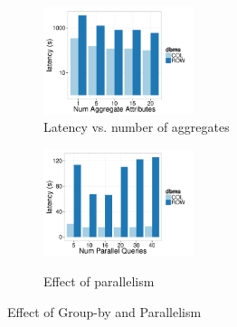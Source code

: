 \begin{figure}[h]
	\centering
	\vspace*{-10pt}
	\begin{subfigure}{0.48\linewidth}
		\centering
		\includegraphics[width=4.4cm] {Images/multi_agg.pdf}
		\vspace{-15pt}
		\caption{Latency vs. number of aggregates}
		\label{fig:multi_agg}
	\end{subfigure}
	\begin{subfigure}{0.48\linewidth}
		\centering
		\includegraphics[width=4.4cm] {Images/parallel_noop.pdf}\
		\vspace{-15pt}
		\caption{Effect of parallelism}
		\label{fig:parallelism}
	\end{subfigure}
	\vspace{-10pt}
	\caption{Effect of Group-by and Parallelism}
\end{figure}



